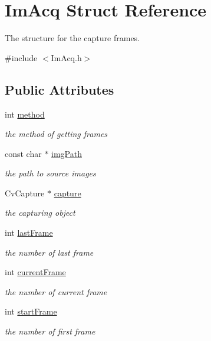 \hypertarget{structImAcq}{\section{Im\-Acq Struct Reference}
\label{structImAcq}
}


The structure for the capture frames.  




{\ttfamily \#include $<$Im\-Acq.\-h$>$}

\subsection*{Public Attributes}
\begin{DoxyCompactItemize}
\item 
int \hyperlink{structImAcq_a338a470fffa65fbfb9fade98a8fc12ca}{method}
\begin{DoxyCompactList}\small\item\em the method of getting frames \end{DoxyCompactList}\item 
const char $\ast$ \hyperlink{structImAcq_ae389de4997bf71e132171734a7d627eb}{img\-Path}
\begin{DoxyCompactList}\small\item\em the path to source images \end{DoxyCompactList}\item 
Cv\-Capture $\ast$ \hyperlink{structImAcq_a71a1e8a55bfdf429634751a597a6dcba}{capture}
\begin{DoxyCompactList}\small\item\em the capturing object \end{DoxyCompactList}\item 
int \hyperlink{structImAcq_a0afeeee09d54a896433376cf359d209f}{last\-Frame}
\begin{DoxyCompactList}\small\item\em the number of last frame \end{DoxyCompactList}\item 
int \hyperlink{structImAcq_a0be9cca3c7dbda6da3ce2752717ce885}{current\-Frame}
\begin{DoxyCompactList}\small\item\em the number of current frame \end{DoxyCompactList}\item 
int \hyperlink{structImAcq_a1f52cf31c1f19f27846d481654a370e2}{start\-Frame}
\begin{DoxyCompactList}\small\item\em the number of first frame \end{DoxyCompactList}\item 

\end{DoxyCompactItemize}
